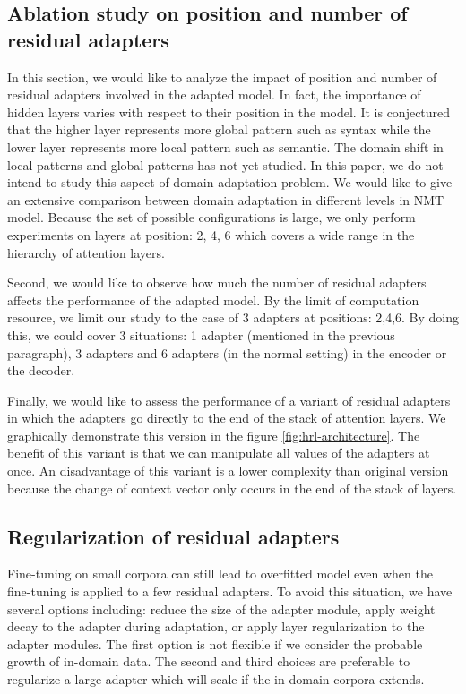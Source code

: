 \documentclass[11pt,a4paper]{article}
\newcommand{\fyTodo}[1]{\Todo[FY:]{\textcolor{orange}{#1}}}
\begin{document}
\subsection{Ablation study on position and number of residual adapters \label{ssec:ablatation}}
In this section, we would like to analyze the impact of position and number of residual adapters involved in the adapted model. In fact, the importance of hidden layers varies with respect to their position in the model. It is conjectured that the higher layer represents more global pattern such as syntax while the lower layer represents more local pattern such as semantic\fyTodo{Missing reference here}. The domain shift in local patterns and global patterns has not yet studied. In this paper, we do not intend to study this aspect of domain adaptation problem. We would like to give an extensive comparison between domain adaptation in different levels in NMT model.\fyTodo{Fix style here} Because the set of possible configurations is large, we only perform experiments on layers at position: 2, 4, 6 which covers a wide range in the hierarchy of attention layers. 

Second, we would like to observe how much the number of residual adapters affects the performance of the adapted model. By the limit of computation resource, we limit our study to the case of 3 adapters at positions: 2,4,6. By doing this, we could cover 3 situations: 1 adapter (mentioned in the previous paragraph), 3 adapters and 6 adapters (in the normal setting) in the encoder or the decoder.\fyTodo{We have 12 layers, have we not ?}

Finally, we would like to assess the performance of a variant of residual adapters in which the adapters go directly to the end of the stack of attention layers. We graphically demonstrate this version in the figure \ref{fig:hrl-architecture}. The benefit of this variant is that we can manipulate all values of the adapters at once. An disadvantage of this variant is a lower complexity than original version because the change of context vector only occurs in the end of the stack of layers.

\subsection{Regularization of residual adapters \label{ssec:reg}}
Fine-tuning on small corpora can still lead to overfitted model even when the fine-tuning is applied to a few residual adapters. To avoid this situation, we have several options including: reduce the size of the adapter module, apply weight decay to the adapter during adaptation, or apply layer regularization to the adapter modules. The first option is not flexible \fyTodo{compatible ???} if we consider the probable growth of in-domain data. The second and third choices are preferable to regularize a large adapter which will scale if the in-domain corpora extends.\fyTodo{Style}
\end{document}
